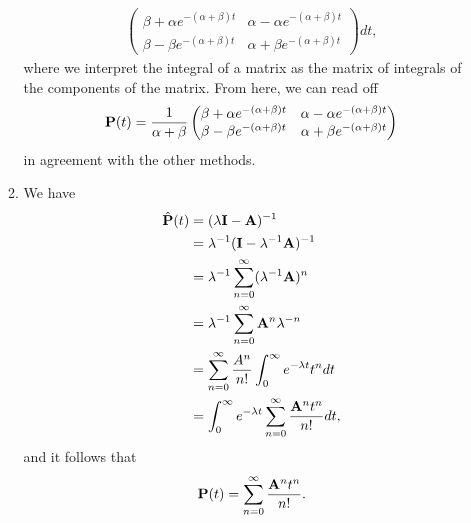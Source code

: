 \documentclass[11pt,a4paper]{article}
\begin{document}
\begin{enumerate}
\begin{enumerate}
\begin{align*}
        \begin{pmatrix}
          \beta + \alpha e^{-(\alpha + \beta)t} & \alpha - \alpha e^{-(\alpha + \beta)t}\\
          \beta - \beta e^{-(\alpha + \beta)t} & \alpha + \beta e^{-(\alpha + \beta)t}
        \end{pmatrix}dt,
      \end{align*}
      where we interpret the integral of a matrix as the matrix of integrals of the components of the matrix. From here, we can read off
      $$
      \vb{P}(t) = \frac{1}{\alpha + \beta}
      \begin{pmatrix}
        \beta + \alpha e^{-(\alpha + \beta)t} & \alpha - \alpha e^{-(\alpha + \beta)t}\\
        \beta - \beta e^{-(\alpha + \beta)t} & \alpha + \beta e^{-(\alpha + \beta)t}
      \end{pmatrix}
      $$
      in agreement with the other methods.
      \item We have
      \begin{align*}
        \hat{\vb{P}}(t)
        &= (\lambda\vb{I} - \vb{A})^{-1}\\
        &= \lambda^{-1}(\vb{I} - \lambda^{-1}\vb{A})^{-1}\\
        &= \lambda^{-1}\sum_{n = 0}^\infty(\lambda^{-1}\vb{A})^n\\
        &= \lambda^{-1}\sum_{n = 0}^\infty\vb{A}^n\lambda^{-n}\\
        &= \sum_{n = 0}^\infty\frac{A^n}{n!}\int_0^\infty e^{-\lambda t}t^ndt\\
        &= \int_0^\infty e^{-\lambda t}\sum_{n = 0}^\infty\frac{\vb{A}^nt^n}{n!}dt,
      \end{align*}
      and it follows that
      $$
      \vb{P}(t) = \sum_{n = 0}^\infty \frac{\vb{A}^nt^n}{n!}.
      $$
    \end{enumerate}
  \end{enumerate}
\end{document}
